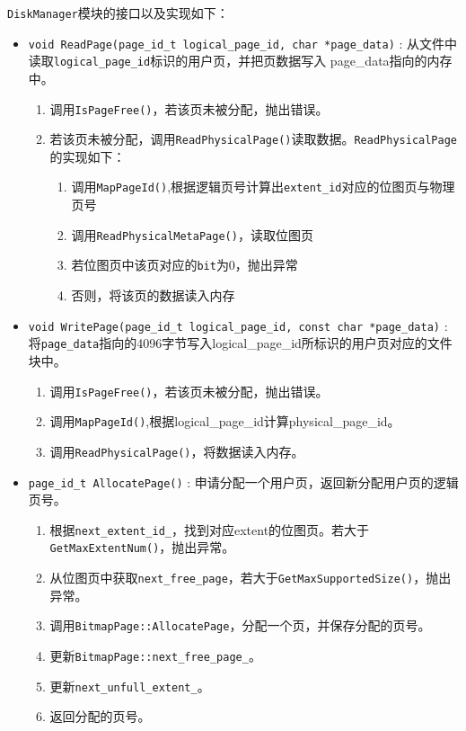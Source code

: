 \documentclass[12pt, a4paper]{article}
\def\c#1{\texttt{#1}}
\def\p{\par}
\begin{document}
\p \c{DiskManager}模块的接口以及实现如下：
\begin{itemize}
	\item \c{void\ ReadPage(page\_id\_t logical\_page\_id, char *page\_data)} : 从文件中读取\c{logical\_page\_id}标识的用户页，并把页数据写入 page\_data指向的内存中。\begin{enumerate}
  \item 调用\c{IsPageFree()}，若该页未被分配，抛出错误。
  \item 若该页未被分配，调用\c{ReadPhysicalPage()}读取数据。\c{ReadPhysicalPage}的实现如下：\begin{enumerate}
	  \item 调用\c{MapPageId()},根据逻辑页号计算出\c{extent\_id}对应的位图页与物理页号
   \item 调用\c{ReadPhysicalMetaPage()}，读取位图页
   \item 若位图页中该页对应的\c{bit}为0，抛出异常
   \item 否则，将该页的数据读入内存
  \end{enumerate}
	\end{enumerate}
 \item \c{void WritePage(page\_id\_t logical\_page\_id, const char *page\_data)} : 将\c{page\_data}指向的4096字节写入logical\_page\_id所标识的用户页对应的文件块中。\begin{enumerate}
 \item 调用\c{IsPageFree()}，若该页未被分配，抛出错误。
   \item 调用\c{MapPageId()},根据logical\_page\_id计算physical\_page\_id。
   \item 调用\c{ReadPhysicalPage()}，将数据读入内存。
 \end{enumerate}
 \item \c{page\_id\_t AllocatePage()} : 申请分配一个用户页，返回新分配用户页的逻辑页号。\begin{enumerate}
   \item 根据\c{next\_extent\_id\_}，找到对应extent的位图页。若大于\c{GetMaxExtentNum()}，抛出异常。
   \item 从位图页中获取\c{next\_free\_page}，若大于\c{GetMaxSupportedSize()}，抛出异常。
   \item 调用\c{BitmapPage::AllocatePage}，分配一个页，并保存分配的页号。
   \item 更新\c{BitmapPage::next\_free\_page\_}。
   \item 更新\c{next\_unfull\_extent\_}。
   \item 返回分配的页号。
 \end{enumerate}

\end{itemize}
\end{document}
